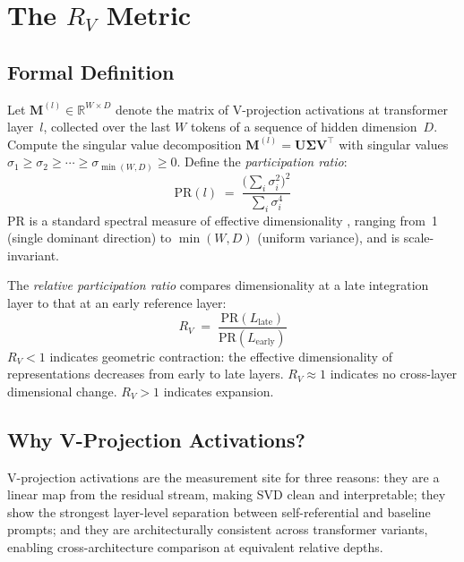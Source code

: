 \documentclass{article}
\newcommand{\RV}{R_V}
\newcommand{\PR}{\text{PR}}
\begin{document}
\section{The $\RV$ Metric}
\label{sec:metric}

\subsection{Formal Definition}

Let $\mathbf{M}^{(l)} \in \mathbb{R}^{W \times D}$ denote the matrix of V-projection activations at
transformer layer~$l$, collected over the last $W$ tokens of a sequence of hidden dimension~$D$.
Compute the singular value decomposition $\mathbf{M}^{(l)} = \mathbf{U} \boldsymbol{\Sigma} \mathbf{V}^\top$
with singular values $\sigma_1 \geq \sigma_2 \geq \cdots \geq \sigma_{\min(W,D)} \geq 0$.
Define the \emph{participation ratio}:
\begin{equation}
    \PR(l) \;=\; \frac{\bigl(\sum_i \sigma_i^2\bigr)^2}{\sum_i \sigma_i^4}
    \label{eq:pr}
\end{equation}
$\PR$ is a standard spectral measure of effective dimensionality \citep{gao2017theory,
roy2007effective}, ranging from~1 (single dominant direction) to $\min(W, D)$ (uniform variance),
and is scale-invariant.

The \emph{relative participation ratio} compares dimensionality at a late integration layer to that
at an early reference layer:
\begin{equation}
    \RV \;=\; \frac{\PR(L_\mathrm{late})}{\PR(L_\mathrm{early})}
    \label{eq:rv}
\end{equation}
$\RV < 1$ indicates geometric contraction: the effective dimensionality of representations decreases
from early to late layers.
$\RV \approx 1$ indicates no cross-layer dimensional change.
$\RV > 1$ indicates expansion.

\subsection{Why V-Projection Activations?}

V-projection activations are the measurement site for three reasons:
they are a linear map from the residual stream, making SVD clean and interpretable;
they show the strongest layer-level separation between self-referential and baseline prompts;
and they are architecturally consistent across transformer variants, enabling cross-architecture
comparison at equivalent relative depths.
\end{document}
